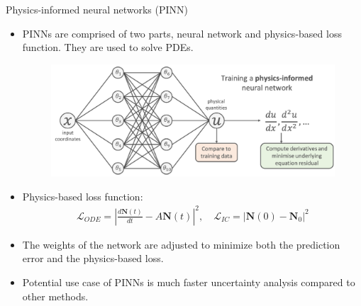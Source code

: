 \documentclass[9pt]{beamer}
\begin{document}
\begin{frame}[fragile]{Physics-informed neural networks (PINN)}
\begin{itemize}
    \item PINNs are comprised of two parts, neural network and physics-based loss function. They are used to solve PDEs.\footnotemark
    \begin{figure}
        \centering
        \includegraphics[width = 7.0 cm]{pinn.png}
    \end{figure}
    \item Physics-based loss function:
    \begin{align*}
        \mathcal{L}_{ODE} = \left|\frac{d\mathbf{N}(t)}{dt} - A \mathbf{N}(t)\right|^2, \quad
        \mathcal{L}_{IC} = \left|\mathbf{N}(0) - \mathbf{N}_0\right|^2
    \end{align*}
    \item The weights of the network are adjusted to minimize both the prediction error and the physics-based loss.
    \item Potential use case of PINNs is much faster uncertainty analysis compared to other methods.
\end{itemize}
\end{frame}
\end{document}
